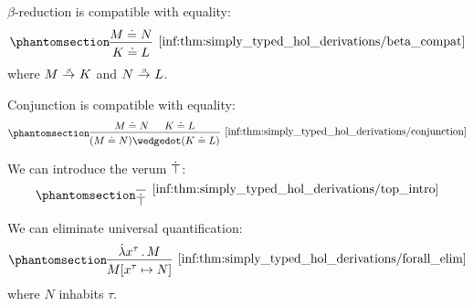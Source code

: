 \begin{proposition}
\begin{thmenum}[series=thm:simply_typed_hol_derivations]
     \( \beta \)-reduction is compatible with equality:
    \begin{equation*}\taglabel[\ensuremath{ \logic{HOL}_{=\beta} }]{inf:thm:simply_typed_hol_derivations/beta_compat}
      \begin{prooftree}
        \hypo{ M \syneq N }
        \infer1[\ref{inf:thm:simply_typed_hol_derivations/beta_compat}]{ K \syneq L },
      \end{prooftree}
    \end{equation*}
    where \( M \bred K \) and \( N \bred L \).

     Conjunction is compatible with equality:
    \begin{equation*}\taglabel[\ensuremath{ \logic{HOL}_{=\wedge} }]{inf:thm:simply_typed_hol_derivations/conjunction}
      \begin{prooftree}
        \hypo{ M \syneq N }
        \hypo{ K \syneq L }
        \infer2[\ref{inf:thm:simply_typed_hol_derivations/conjunction}]{ (M \syneq N) \synwedge (K \syneq L) }
      \end{prooftree}
    \end{equation*}

     We can introduce the verum \( \dot{\top} \):
    \begin{equation*}\taglabel[\ensuremath{ \logic{HOL}_{\top+} }]{inf:thm:simply_typed_hol_derivations/top_intro}
      \begin{prooftree}
        \infer0[\ref{inf:thm:simply_typed_hol_derivations/top_intro}]{ \syntop },
      \end{prooftree}
    \end{equation*}

     We can eliminate universal quantification:
    \begin{equation*}\taglabel[\ensuremath{ \logic{HOL}_{\forall-} }]{inf:thm:simply_typed_hol_derivations/forall_elim}
      \begin{prooftree}
        \hypo{ \qabs {x^\tau} M }
        \infer1[\ref{inf:thm:simply_typed_hol_derivations/forall_elim}]{ M[x^\tau \mapsto N] },
      \end{prooftree}
    \end{equation*}
    where \( N \) inhabits \( \tau \).


\end{thmenum}
\end{proposition}
